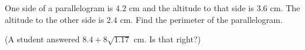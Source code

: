 One side of a parallelogram is $4.2$ cm and the altitude to that side is $3.6$ cm. The altitude to the other side is $2.4$ cm. Find the perimeter of the parallelogram.

(A student answered $8.4+8\sqrt{1.17}$ cm. Is that right?)
